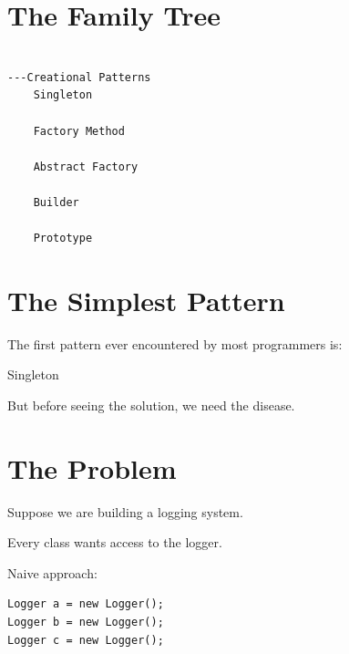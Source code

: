 \documentclass[11pt,a4paper]{book}
\begin{document}
\section{The Family Tree}

\begin{verbatim}

---Creational Patterns
    Singleton

    Factory Method

    Abstract Factory

    Builder
    
    Prototype

\end{verbatim}


\section{The Simplest Pattern}

The first pattern ever encountered
by most programmers is:


Singleton


But before seeing the solution,
we need the disease.


\section{The Problem}

Suppose we are building
a logging system.


Every class wants access
to the logger.


Naive approach:

\begin{verbatim}
Logger a = new Logger();
Logger b = new Logger();
Logger c = new Logger();
\end{verbatim}
\end{document}
